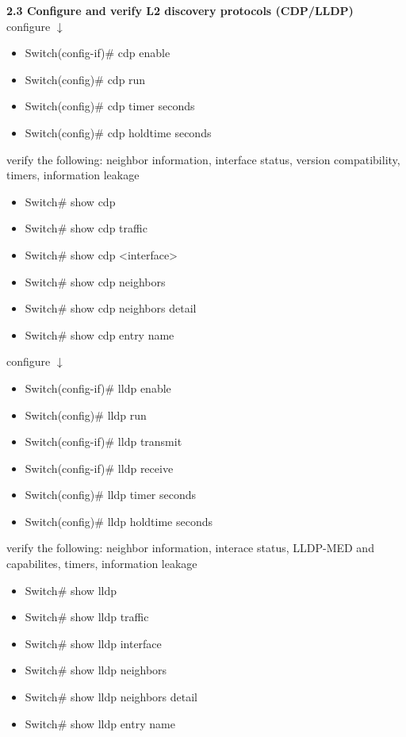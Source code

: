 \documentclass{article}
\begin{document}
\noindent\textbf{2.3 Configure and verify L2 discovery protocols (CDP/LLDP)}\\

configure $\downarrow$
\begin{itemize}
\item Switch(config-if)\# cdp enable
\item Switch(config)\# cdp run
\item Switch(config)\# cdp timer seconds
\item Switch(config)\# cdp holdtime seconds
\end{itemize}
		
verify the following: neighbor information, interface status, version compatibility, timers, information leakage
\begin{itemize}
\item Switch\# show cdp
\item Switch\# show cdp traffic
\item Switch\# show cdp \textless interface\textgreater
\item Switch\# show cdp neighbors
\item Switch\# show cdp neighbors detail
\item Switch\# show cdp entry name
\end{itemize}
		
configure $\downarrow$
\begin{itemize}
\item Switch(config-if)\# lldp enable
\item Switch(config)\# lldp run
\item Switch(config-if)\# lldp transmit
\item Switch(config-if)\# lldp receive
\item Switch(config)\# lldp timer seconds
\item Switch(config)\# lldp holdtime seconds
\end{itemize}
		
verify the following: neighbor information, interace status, LLDP-MED and capabilites, timers, information leakage
\begin{itemize}
\item Switch\# show lldp
\item Switch\# show lldp traffic
\item Switch\# show lldp interface
\item Switch\# show lldp neighbors
\item Switch\# show lldp neighbors detail
\item Switch\# show lldp entry name
\end{itemize}
  		
\end{document}
